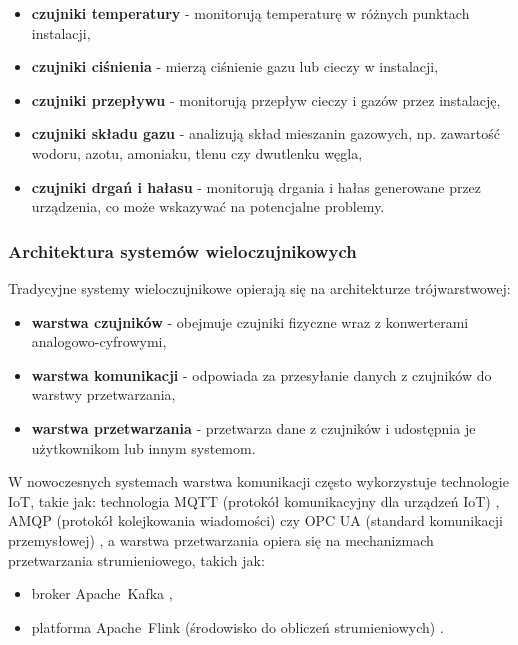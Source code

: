 \begin{itemize}
    \item \textbf{czujniki temperatury} - monitorują temperaturę w różnych punktach instalacji,
    \item \textbf{czujniki ciśnienia} - mierzą ciśnienie gazu lub cieczy w instalacji,
    \item \textbf{czujniki przepływu} - monitorują przepływ cieczy i gazów przez instalację,
    \item \textbf{czujniki składu gazu} - analizują skład mieszanin gazowych, np. zawartość wodoru, azotu, amoniaku, tlenu czy dwutlenku węgla,
    \item \textbf{czujniki drgań i hałasu} - monitorują drgania i hałas generowane przez urządzenia, co może wskazywać na potencjalne problemy.
\end{itemize}

\newpage

\subsubsection{Architektura systemów wieloczujnikowych}
\label{subsubsec:architektura_systemow}

Tradycyjne systemy wieloczujnikowe opierają się na architekturze trójwarstwowej:

\begin{itemize}
    \item \textbf{warstwa czujników} - obejmuje czujniki fizyczne wraz z konwerterami analogowo-cyfrowymi,
    \item \textbf{warstwa komunikacji} - odpowiada za przesyłanie danych z czujników do warstwy przetwarzania,
    \item \textbf{warstwa przetwarzania} - przetwarza dane z czujników i udostępnia je użytkownikom lub innym systemom.
\end{itemize}

W nowoczesnych systemach warstwa komunikacji często wykorzystuje technologie IoT, takie jak: technologia MQTT (protokół komunikacyjny dla urządzeń IoT) \cite{ietf_mqtt_v5}, AMQP (protokół kolejkowania wiadomości) \cite{amqp_v1} czy OPC UA (standard komunikacji przemysłowej) \cite{opc_ua_spec},
a warstwa przetwarzania opiera się na mechanizmach przetwarzania strumieniowego, takich jak:

\begin{itemize}
    \item broker \mbox{Apache Kafka} \cite{kafka},
    \item platforma \mbox{Apache Flink} (środowisko do obliczeń strumieniowych) \cite{flink}.
\end{itemize}

